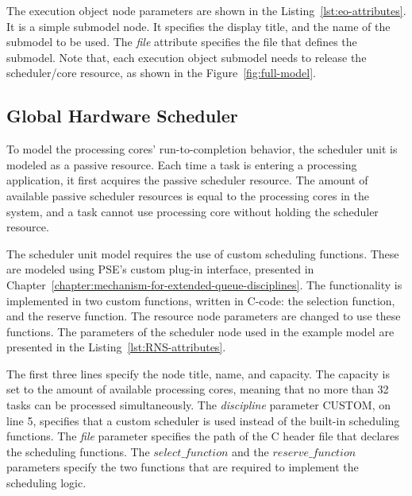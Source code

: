 

The execution object node parameters are shown in the Listing~\ref{lst:eo-attributes}. It is a simple submodel node. It specifies the display title, and the name of the submodel to be used. The \emph{file} attribute specifies the file that defines the submodel. Note that, each execution object submodel needs to release the scheduler/core resource, as shown in the Figure~\ref{fig:full-model}.

\subsection{Global Hardware Scheduler}
\label{sec:scheduler-unit}
To model the processing cores' run-to-completion behavior, the scheduler unit is modeled as a passive resource. Each time a task is entering a processing application, it first acquires the passive scheduler resource. The amount of available passive scheduler resources is equal to the processing cores in the system, and a task cannot use processing core without holding the scheduler resource.

The scheduler unit model requires the use of custom scheduling functions. These are modeled using PSE's custom plug-in interface, presented in Chapter~\ref{chapter:mechanism-for-extended-queue-disciplines}. The functionality is implemented in two custom functions, written in C-code: the selection function, and the reserve function. The resource node parameters are changed to use these functions. The parameters of the scheduler node used in the example model are presented in the Listing~\ref{lst:RNS-attributes}.



The first three lines specify the node title, name, and capacity. The capacity is set to the amount of available processing cores, meaning that no more than 32 tasks can be processed simultaneously. The \emph{discipline} parameter \mbox{CUSTOM}, on line 5, specifies that a custom scheduler is used instead of the built-in scheduling functions. The \emph{file} parameter specifies the path of the C header file that declares the scheduling functions. The \emph{$select\_function$} and the \emph{$reserve\_function$} parameters specify the two functions that are required to implement the scheduling logic.

